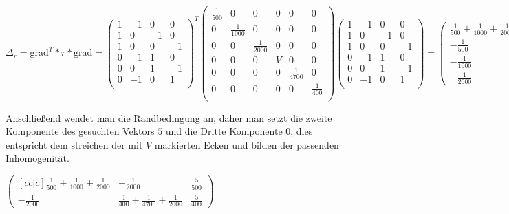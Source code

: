 \documentclass[11pt,a4paper,leqno]{report}
\numberwithin{equation}{chapter}
\begin{document}
\begin{center}
$
\Delta_r  = \text{grad}^T * r * \text{grad} = 
\begin{pmatrix}
1 & -1 & 0 & 0\\
1 & 0 & -1 & 0\\
1 & 0 & 0 & -1\\
0 & -1 & 1 & 0\\
0 & 0 & 1 & -1\\
0 & -1 & 0& 1\\
\end{pmatrix}^T
\begin{pmatrix}
\frac{1}{500}& 0 &0& 0& 0&0\\
0& \frac{1}{1000} & 0 & 0 &0&0\\
0 & 0 & \frac{1}{2000} & 0 &0&0\\
0 & 0 & 0 & V & 0&0\\
0 & 0 & 0 & 0 & \frac{1}{4700}&0\\
0 & 0 & 0& 0 & 0 &\frac{1}{400}\\
\end{pmatrix}
\begin{pmatrix}
1 & -1 & 0 & 0\\
1 & 0 & -1 & 0\\
1 & 0 & 0 & -1\\
0 & -1 & 1 & 0\\
0 & 0 & 1 & -1\\
0 & -1 & 0& 1\\
\end{pmatrix}=
\begin{pmatrix}
	\frac{1}{500} + \frac{1}{1000} + \frac{1}{2000}& -\frac{1}{500}  & -\frac{1}{1000} & -\frac{1}{2000}\\
	-\frac{1}{500}  & \frac{1}{500} + V + \frac{1}{400} & -V & -\frac{1}{400}\\
	-\frac{1}{1000} & -V& \frac{1}{1000} + V + \frac{1}{4700} & -\frac{1}{4700} \\
	-\frac{1}{2000} & -\frac{1}{400}&-\frac{1}{4700}  & \frac{1}{400} + \frac{1}{4700} + \frac{1}{2000}
\end{pmatrix}
$
\end{center}
Anschlie\ss{}end wendet man die Randbedingung an, daher man setzt die zweite Komponente des gesuchten Vektors $5$ und die Dritte Komponente $0$, dies entspricht dem streichen der mit $V$ markierten Ecken und bilden der passenden Inhomogenit\"at.
\begin{center}
	$
	\begin{pmatrix}[cc|c]
	\frac{1}{500} + \frac{1}{1000} + \frac{1}{2000} & -\frac{1}{2000} & \frac{5}{500}\\
	-\frac{1}{2000}& \frac{1}{400} + \frac{1}{4700} + \frac{1}{2000} & \frac{5}{400}
	\end{pmatrix}
	$
\end{center}
\end{document}
